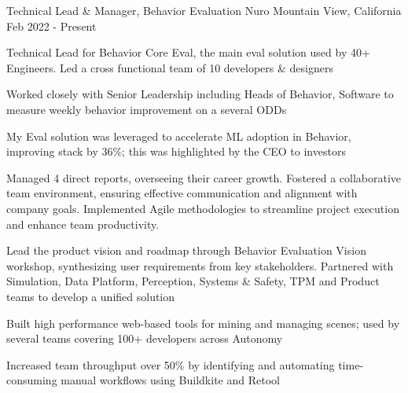 \vspace{-3mm}

\begin{cventries}

  \cventry
	{Technical Lead \& Manager, Behavior Evaluation} %
	{Nuro} %
	{Mountain View, California} %
	{Feb 2022 - Present} %
	{
		\begin{cvitems}
		\item {Technical Lead for Behavior Core Eval, the main eval solution used by 40+ Engineers. Led a cross functional team of 10 developers \& designers}
		\item {Worked closely with Senior Leadership including Heads of Behavior, Software to measure weekly behavior improvement on a several ODDs}
		\item {My Eval solution was leveraged to accelerate ML adoption in Behavior, improving stack by 36\%; this was highlighted by the CEO to investors}
		\item {Managed 4 direct reports, overseeing their career growth. Fostered a collaborative team environment, ensuring effective communication and alignment with company goals. Implemented Agile methodologies to streamline project execution and enhance team productivity.}
		\item {Lead the product vision and roadmap through Behavior Evaluation Vision workshop, synthesizing user requirements from key stakeholders. Partnered with Simulation, Data Platform, Perception, Systems \& Safety, TPM and Product teams to develop a unified solution}
		\item {Built high performance web-based tools for mining and managing scenes; used by several teams covering 100+ developers across Autonomy}
		\item {Increased team throughput over 50\% by identifying and automating time-consuming manual workflows using Buildkite and Retool}
		\end{cvitems}	
	}


\end{cventries}

